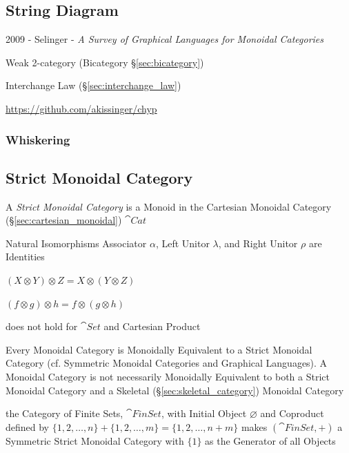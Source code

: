 \subsection{String Diagram}\label{sec:string_diagram}

2009 - Selinger - \emph{A Survey of Graphical Languages for Monoidal Categories}

Weak 2-category (Bicategory \S\ref{sec:bicategory})

Interchange Law (\S\ref{sec:interchange_law})

\url{https://github.com/akissinger/chyp}



\subsubsection{Whiskering}\label{sec:whiskering}



\subsection{Strict Monoidal Category}\label{sec:strict_monoidal}

A \emph{Strict Monoidal Category} is a Monoid in the Cartesian
Monoidal Category (\S\ref{sec:cartesian_monoidal}) $\cat{Cat}$

Natural Isomorphisms Associator $\alpha$, Left Unitor $\lambda$, and
Right Unitor $\rho$ are Identities

$(X \otimes Y) \otimes Z = X \otimes (Y \otimes Z)$

$(f \otimes g) \otimes h = f \otimes (g \otimes h)$

does not hold for $\cat{Set}$ and Cartesian Product

Every Monoidal Category is Monoidally Equivalent to a Strict Monoidal
Category (cf. Symmetric Monoidal Categories and Graphical Languages).
A Monoidal Category is not necessarily Monoidally Equivalent to both a
Strict Monoidal Category and a Skeletal
(\S\ref{sec:skeletal_category}) Monoidal Category

the Category of Finite Sets, $\cat{FinSet}$, with Initial Object $\varnothing$
and Coproduct defined by $\{1,2,\ldots,n\} + \{1,2,\ldots,m\} =
\{1,2,\ldots,n+m\}$ makes $(\cat{FinSet}, +)$ a
Symmetric Strict Monoidal Category with $\{1\}$ as the Generator of all Objects



